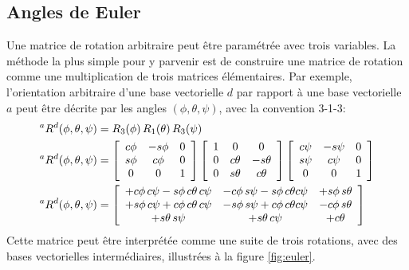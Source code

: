 \subsection{Angles de Euler}
\label{sec:angeuler}

Une matrice de rotation arbitraire peut être paramétrée avec trois variables. La méthode la plus simple pour y parvenir est de construire une matrice de rotation comme une multiplication de trois matrices élémentaires. Par exemple, l'orientation arbitraire d'une base vectorielle $d$ par rapport à une base vectorielle $a$ peut être décrite par les angles $( \phi, \theta, \psi)$, avec la convention 3-1-3:
\begin{align}
{}^aR^d(\phi,\theta,\psi) &= R_3(\phi) \, R_1(\theta) \, R_3(\psi) \\
{}^aR^d(\phi,\theta,\psi) &=
\left[ \begin{array}{c c c}
		   c\phi & -s\phi & 0 \\
		   s\phi & c\phi & 0 \\
		   0 & 0 & 1
\end{array}  \right]
\left[ \begin{array}{c c c}
		   1 & 0 & 0 \\
		   0 & c\theta  & -s\theta \\
		   0 & s\theta & c\theta
\end{array}  \right]
\left[ \begin{array}{c c c}
		   c\psi & -s\psi & 0 \\
		   s\psi & c\psi & 0 \\
		   0 & 0 & 1
\end{array}  \right] \\
{}^aR^d(\phi,\theta,\psi) &=
\left[ \begin{array}{c c c}
		   + c\phi \, c\psi - s\phi\,c\theta\,c\psi  & - c\phi \, s\psi - s\phi \, c\theta c\psi  & + s\phi \, s\theta  \\
		   + s\phi \, c\psi + c\phi\,c\theta\,c\psi  & - s\phi \, s\psi + c\phi \, c\theta c\psi  & - c\phi \, s\theta  \\
		   + s\theta \, s\psi                        & + s\theta \, c\psi                          & + c\theta
\end{array}  \right]
\end{align}
Cette matrice peut être interprétée comme une suite de trois rotations, avec des bases vectorielles intermédiaires, illustrées à la figure \ref{fig:euler}.
